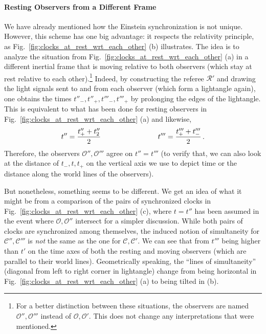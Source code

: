 \documentclass[../relativity_main.tex]{subfiles}
\begin{document}
			\paragraph{Resting Observers from a Different Frame}
We have already mentioned how the Einstein synchronization is not unique. However, this scheme has one big advantage: it respects the relativity principle, as Fig.~\ref{fig:clocks_at_rest_wrt_each_other} (b) illustrates. The idea is to analyze the situation from Fig.~\ref{fig:clocks_at_rest_wrt_each_other} (a) in a different inertial frame that is moving relative to both observers (which stay at rest relative to each other).\footnote{For a better distinction between these situations, the observers are named $\mathcal{O}'', \mathcal{O}'''$ instead of $\mathcal{O}, \mathcal{O}'$. This does not change any interpretations that were mentioned.} Indeed, by constructing the referee $\mathcal{R}'$ and drawing the light signals sent to and from each observer (which form a lightangle again), one obtains the times $t''_-, t''_+, t'''_-, t'''_+$ by prolonging the edges of the lightangle. This is equivalent to what has been done for resting observers in Fig.~\ref{fig:clocks_at_rest_wrt_each_other} (a) and likewise,
\begin{equation}
	t'' = \frac{t''_+ + t''_2}{2}
	\qquad \qquad \qquad \qquad
	t''' = \frac{t'''_+ + t'''_-}{2}
	\, .
\end{equation}
Therefore, the observers $\mathcal{O}'', \mathcal{O}'''$ agree on $t'' = t'''$ (to verify that, we can also look at the distance of $t_-, t, t_+$ on the vertical axis we use to depict time or the distance along the world lines of the observers).

But nonetheless, something seems to be different. We get an idea of what it might be from a comparison of the pairs of synchronized clocks in Fig.~\ref{fig:clocks_at_rest_wrt_each_other} (c), where  $t = t''$ has been assumed in the event where $\mathcal{O}, \mathcal{O}''$ intersect for a simpler discussion. While both pairs of clocks are synchronized among themselves, the induced notion of simultaneity for $\mathcal{C}'', \mathcal{C}'''$ is \emph{not} the same as the one for $\mathcal{C}, \mathcal{C}'$. We can see that from $t'''$ being higher than $t'$ on the time axes of both the resting and moving observers (which are parallel to their world lines). Geometrically speaking, the \enquote{lines of simultaneity} (diagonal from left to right corner in lightangle) change from being horizontal in Fig.~\ref{fig:clocks_at_rest_wrt_each_other} (a) to being tilted in (b).\\
\end{document}
